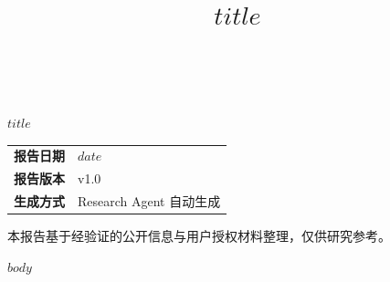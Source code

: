 \documentclass[UTF8,fontset=fandol,11pt]{ctexart}
\title{$title$}
\begin{document}
\begin{titlepage}
  \thispagestyle{empty}
  \vspace*{22mm}
  \noindent{\color{BrokerBlue}\rule{\linewidth}{2.2pt}}\\[13mm]
  {\fontsize{25}{34}\selectfont\bfseries $title$\par}
  \vspace{7mm}
  {\Large\color{BrokerMuted}\ReportSubtitle\par}
  \vfill
  \begin{tabular}{@{}ll@{}}
    \textbf{报告日期} & $date$ \\
    \textbf{报告版本} & v1.0 \\
    \textbf{生成方式} & Research Agent 自动生成 \\
  \end{tabular}
  \par\vspace{14mm}
  {\small\color{BrokerMuted}本报告基于经验证的公开信息与用户授权材料整理，仅供研究参考。\par}
  \vspace{5mm}
  \noindent{\color{BrokerGold}\rule{\linewidth}{1.1pt}}
\end{titlepage}
\tableofcontents
\clearpage
$body$
\end{document}
